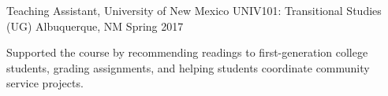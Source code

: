 \begin{cventries}
        \cventry
    {Teaching Assistant, University of New Mexico} %
    {UNIV101: Transitional Studies (UG)} %
    {Albuquerque, NM} %
    {Spring 2017} %
    {
      \begin{cvitems} %
    \item Supported the course by recommending readings to first-generation college students, grading assignments, \newline and helping students coordinate community service projects.
      \end{cvitems}
    }
    







\end{cventries}
